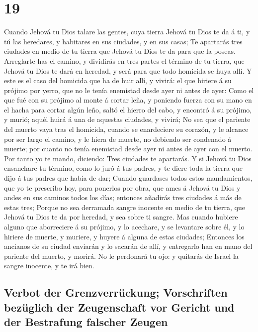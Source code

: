 \hypertarget{section-18}{%
\section{19}\label{section-18}}

 Cuando Jehová tu Dios talare las gentes, cuya tierra
Jehová tu Dios te da á ti, y tú las heredares, y habitares en sus
ciudades, y en sus casas;  Te apartarás tres ciudades en
medio de tu tierra que Jehová tu Dios te da para que la poseas.
 Arreglarte has el camino, y dividirás en tres partes el
término de tu tierra, que Jehová tu Dios te dará en heredad, y será para
que todo homicida se huya allí.  Y este es el caso del
homicida que ha de huir allí, y vivirá: el que hiriere á su prójimo por
yerro, que no le tenía enemistad desde ayer ni antes de ayer:
 Como el que fué con su prójimo al monte á cortar leña, y
poniendo fuerza con su mano en el hacha para cortar algún leño, saltó el
hierro del cabo, y encontró á su prójimo, y murió; aquél huirá á una de
aquestas ciudades, y vivirá;  No sea que el pariente del
muerto vaya tras el homicida, cuando se enardeciere su corazón, y le
alcance por ser largo el camino, y le hiera de muerte, no debiendo ser
condenado á muerte; por cuanto no tenía enemistad desde ayer ni antes de
ayer con el muerto.  Por tanto yo te mando, diciendo: Tres
ciudades te apartarás.  Y si Jehová tu Dios ensanchare tu
término, como lo juró á tus padres, y te diere toda la tierra que dijo á
tus padres que había de dar;  Cuando guardases todos estos
mandamientos, que yo te prescribo hoy, para ponerlos por obra, que ames
á Jehová tu Dios y andes en sus caminos todos los días; entonces
añadirás tres ciudades á más de estas tres;  Porque no
sea derramada sangre inocente en medio de tu tierra, que Jehová tu Dios
te da por heredad, y sea sobre ti sangre.  Mas cuando
hubiere alguno que aborreciere á su prójimo, y lo acechare, y se
levantare sobre él, y lo hiriere de muerte, y muriere, y huyere á alguna
de estas ciudades;  Entonces los ancianos de su ciudad
enviarán y lo sacarán de allí, y entregarlo han en mano del pariente del
muerto, y morirá.  No le perdonará tu ojo: y quitarás de
Israel la sangre inocente, y te irá bien.

\hypertarget{verbot-der-grenzverruxfcckung-vorschriften-bezuxfcglich-der-zeugenschaft-vor-gericht-und-der-bestrafung-falscher-zeugen}{%
\subsection{Verbot der Grenzverrückung; Vorschriften bezüglich der
Zeugenschaft vor Gericht und der Bestrafung falscher
Zeugen}\label{verbot-der-grenzverruxfcckung-vorschriften-bezuxfcglich-der-zeugenschaft-vor-gericht-und-der-bestrafung-falscher-zeugen}}

